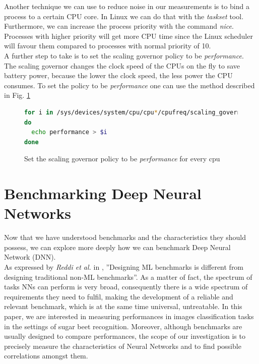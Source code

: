 Another technique we can use to reduce noise in our measurements is  to bind a process to a certain CPU core. In Linux we can do that with the \textit{taskset} tool. \cite{LinuxManualWeb}\\
Furthermore, we can increase the process priority with the command \textit{nice}. Processes with higher priority will get more CPU time since the Linux scheduler will favour them compared to processes with normal priority of 10. \cite{LinuxManualWeb}\\
A further step to take is to set the scaling governor policy to be \textit{performance}. The scaling governor changes the clock speed of the CPUs on the fly to save battery power, because the lower the clock speed, the less power the CPU consumes. To set the policy to be \textit{performance} one can use the method described in Fig. \ref{fig:per_sca}
\begin{figure}[h]
\begin{lstlisting}[language=bash]
for i in /sys/devices/system/cpu/cpu*/cpufreq/scaling_governor
do
  echo performance > $i
done
\end{lstlisting}
\caption{Set the scaling governor policy to be \textit{performance} for every cpu}
\label{fig:per_sca}
\end{figure}



\section{Benchmarking Deep Neural Networks}\label{benchmarking_nn}
Now that we have understood benchmarks and the characteristics they should possess, we can explore more deeply how we can benchmark Deep Neural Network (DNN).\\
As expressed by \textit{Reddi et al. } in \cite{reddi2020mlperf}, ''Designing ML benchmarks is different from designing traditional non-ML benchmarks''. As a matter of fact, the spectrum of tasks NNs can perform is very broad, consequently there is a wide spectrum of requirements they need to fulfil, making the development of a reliable and relevant benchmark, which is at the same time universal, untreatable. In this paper, we are interested in measuring performances in images classification tasks in the settings of sugar beet recognition. Moreover, although benchmarks are usually designed to compare performances, the scope of our investigation is to precisely measure the characteristics of Neural Networks and to find possible correlations amongst them.



